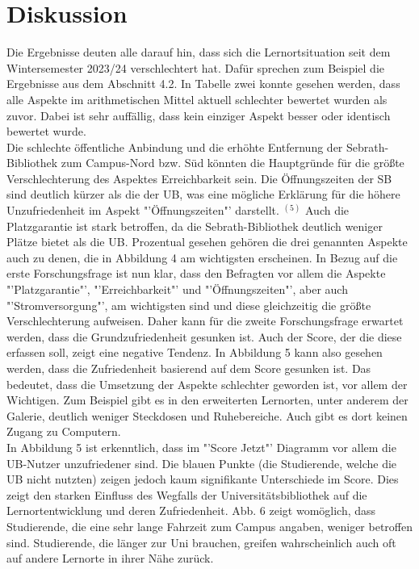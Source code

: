 \documentclass[11pt, a4paper]{article}
\begin{document}
\section{Diskussion}
Die Ergebnisse deuten alle darauf hin, dass sich die Lernortsituation seit dem Wintersemester  2023/24 verschlechtert hat. Dafür sprechen zum Beispiel die Ergebnisse aus dem Abschnitt 4.2. In Tabelle zwei konnte gesehen werden, dass alle Aspekte im arithmetischen Mittel aktuell schlechter bewertet wurden als zuvor. Dabei ist sehr auffällig, dass kein einziger Aspekt besser oder identisch bewertet wurde.\\
Die schlechte öffentliche Anbindung und die erhöhte Entfernung der Sebrath-Bibliothek zum Campus-Nord bzw. Süd könnten die Hauptgründe für die größte Verschlechterung des Aspektes Erreichbarkeit sein. Die Öffnungszeiten der SB sind deutlich kürzer als die der UB, was eine mögliche Erklärung für die höhere Unzufriedenheit im Aspekt "'Öffnungszeiten"' darstellt. \hyperref[seitenverweis]{$^{(5)}$}
Auch die Platzgarantie ist stark betroffen, da die Sebrath-Bibliothek deutlich weniger Plätze bietet als die UB. 
Prozentual gesehen gehören die drei genannten Aspekte auch zu denen, die in Abbildung 4 am wichtigsten erscheinen.
In Bezug auf die erste Forschungsfrage ist nun klar, dass den Befragten vor allem die Aspekte "'Platzgarantie"', "'Erreichbarkeit"' und "'Öffnungszeiten"', aber auch "'Stromversorgung"', am wichtigsten sind und diese gleichzeitig die größte Verschlechterung aufweisen. Daher kann für die zweite Forschungsfrage erwartet werden, dass die Grundzufriedenheit gesunken ist.
Auch der Score, der die diese erfassen soll, zeigt eine negative Tendenz. In Abbildung 5 kann also gesehen werden, dass die Zufriedenheit basierend auf dem Score gesunken ist.
Das bedeutet, dass die Umsetzung der Aspekte schlechter geworden ist, vor allem der Wichtigen. Zum Beispiel gibt es in den erweiterten Lernorten, unter anderem der Galerie, deutlich weniger Steckdosen und Ruhebereiche. Auch gibt es dort keinen Zugang zu Computern.  \\ In Abbildung 5 ist erkenntlich, dass im "'Score Jetzt"' Diagramm vor allem die UB-Nutzer unzufriedener sind. Die blauen Punkte (die Studierende, welche die UB nicht nutzten) zeigen jedoch kaum signifikante Unterschiede im Score. Dies zeigt den starken Einfluss des Wegfalls der Universitätsbibliothek auf die Lernortentwicklung und deren Zufriedenheit. Abb. 6 zeigt womöglich, dass Studierende, die eine sehr lange Fahrzeit zum Campus angaben, weniger betroffen sind. Studierende, die länger zur Uni brauchen, greifen wahrscheinlich auch oft auf andere Lernorte in ihrer Nähe zurück. \\
\end{document}
